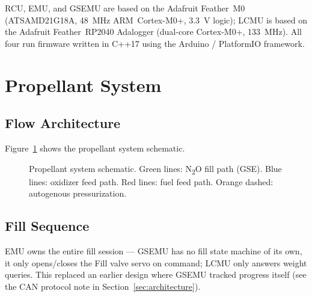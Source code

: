 \documentclass[11pt,letterpaper]{article}
\begin{document}
RCU, EMU, and GSEMU are based on the Adafruit Feather~M0 (ATSAMD21G18A,
48~MHz ARM~Cortex-M0+, 3.3~V logic); LCMU is based on the Adafruit
Feather~RP2040 Adalogger (dual-core Cortex-M0+, 133~MHz). All four run
firmware written in C++17 using the Arduino / PlatformIO framework.

\section{Propellant System}
\label{sec:propellant}

\subsection{Flow Architecture}

Figure~\ref{fig:propellant} shows the propellant system schematic.

\begin{figure}[H]
  \centering
  \resizebox{0.82\textwidth}{!}{}
  \caption{Propellant system schematic. Green lines: N\textsubscript{2}O fill path (GSE).
           Blue lines: oxidizer feed path. Red lines: fuel feed path.
           Orange dashed: autogenous pressurization.}
  \label{fig:propellant}
\end{figure}

\subsection{Fill Sequence}

EMU owns the entire fill session --- GSEMU has no fill state machine of
its own, it only opens/closes the Fill valve servo on command; LCMU only
answers weight queries. This replaced an earlier design where GSEMU
tracked progress itself (see the CAN protocol note in
Section~\ref{sec:architecture}).
\end{document}
